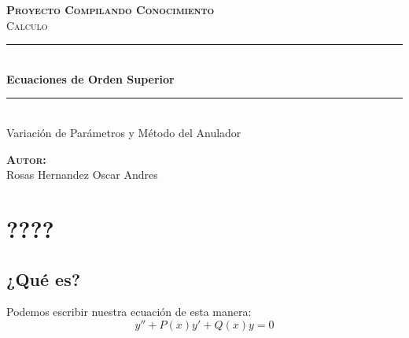 \documentclass[12pt]{article}							    %
\author{Oscar Andrés Rosas}						            %
\begin{document}
\begin{titlepage}

	\center
	\textbf{\textsc{\Large Proyecto Compilando Conocimiento}}\\[1.0cm] 
	\textsc{\Large Calculo}\\[1.0cm] 

	\rule{\linewidth}{0.5mm} \\[1.0cm]
		{ \huge \bfseries Ecuaciones de Orden Superior}\\[1.0cm] 
	\rule{\linewidth}{0.5mm} \\[2.0cm]
	
	{\LARGE Variación de Parámetros y Método del Anulador}\\[7cm] 
	
	\begin{center} \large
	\textbf{\textsc{Autor:}}\\
	Rosas Hernandez Oscar Andres
	\end{center}

	\vfill

\end{titlepage}







\section{????}


\subsection{¿Qué es?}

Podemos escribir nuestra ecuación de esta manera:
\begin{equation}
    y'' + P(x) y' + Q(x) y = 0
\end{equation}
\end{document}
